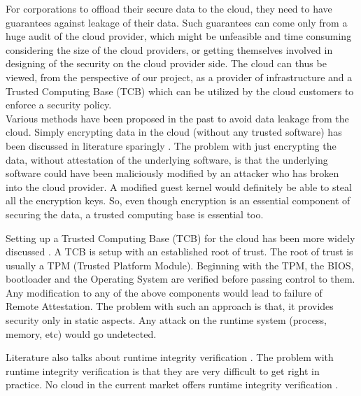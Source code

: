\documentclass[10pt,twocolumn,pdftex]{article}
\begin{document}
For corporations to offload their secure data to the cloud, they need to have guarantees against leakage of their data. Such guarantees can come only from a huge audit of the cloud provider, which might be unfeasible and time consuming considering the size of the cloud providers, or getting themselves involved in designing of the security on the cloud provider side. The cloud can thus be viewed, from the perspective of our project, as a provider of infrastructure and a Trusted Computing Base (TCB) which can be utilized by the cloud customers to enforce a security policy. \\

Various methods have been proposed in the past to avoid data leakage from the cloud. Simply encrypting data in the cloud (without any trusted software) has been discussed in literature sparingly \cite{cryptographic-cloud-storage, towards-secure-cloud-storage}. The problem with just encrypting the data, without attestation of the underlying software, is that the underlying software could have been maliciously modified by an attacker who has broken into the cloud provider. A modified guest kernel would definitely be able to steal all the encryption keys. So, even though encryption is an essential component of securing the data, a trusted computing base is essential too.

Setting up a Trusted Computing Base (TCB) for the cloud has been more widely discussed \cite{towards-trusted-cloud-computing, seeding-clouds-with-trust-anchors, terra, semantic-remote}. A TCB is setup with an established root of trust. The root of trust is usually a TPM (Trusted Platform Module). Beginning with the TPM, the BIOS, bootloader and the Operating System are verified before passing control to them. Any modification to any of the above components would lead to failure of Remote Attestation. The problem with such an approach is that, it provides security only in static aspects. Any attack on the runtime system (process, memory, etc) would go undetected. 

Literature also talks about runtime integrity verification \cite{integrity-1, integrity-2, integrity-3, integrity-4}. The problem with runtime integrity verification is that they are very difficult to get right in practice. No cloud in the current market offers runtime integrity verification \cite{seeding-clouds-with-trust-anchors}.
\end{document}
